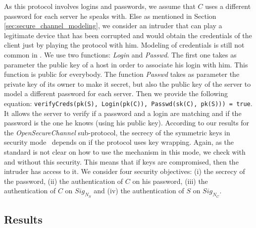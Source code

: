As this protocol involves logins and passwords, we assume that $C$
uses a different password for each server he speaks with.  Else as
mentioned in Section \ref{sec:secure_channel_modeling}, we consider an
intruder that can play a legitimate device that has been corrupted and
would obtain the credentials of the client just by playing the
protocol with him.  Modeling of credentials is still not common in
\proverif.  We use two functions: {\em Login} and {\em Passwd}. The
first one takes as parameter the public key of a host in order to
associate his login with him. This function is public for everybody.
The function {\em Passwd} takes as parameter the private key of its
owner to make it secret, but also the public key of the server to model
a different password for each server.  Then we provide the following
equation: \texttt{verifyCreds(pk(S), Login(pk(C)), Passwd(sk(C),
  pk(S))) = true}.
  It allows
the server to verify if a password and a login are matching and if the
password is the one he knows (using his public key).
According to our results for the {\em OpenSecureChannel} sub-protocol, the
secrecy of the symmetric keys in security mode \sms~depends on if the protocol
uses key wrapping.
Again, as the \opcua{} standard is not clear on how to use the mechanism in
this mode, we check with and without this security.
This means that if keys are compromised, then the intruder has access to it.
We consider four security objectives: (i) the secrecy of the
password, (ii) the authentication of $C$ on his password, (iii) the
authentication of $C$ on $Sig_{N_{S}}$ and (iv) the authentication of $S$ on
$Sig_{N_{C}}$.

\subsection{Results}

